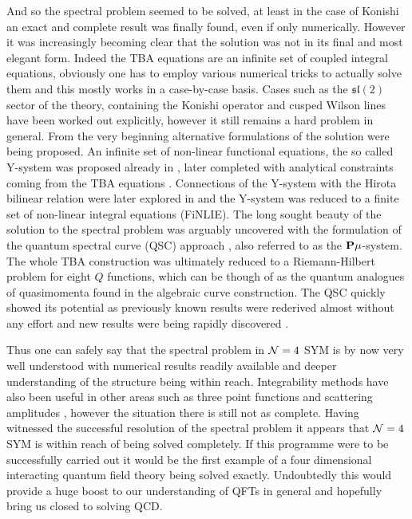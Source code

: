 And so the spectral problem seemed to be solved, at least in the case of Konishi an exact and complete result was finally found, even if only numerically.
However it was increasingly becoming clear that the solution was not in its final and most elegant form.
Indeed the TBA equations are an infinite set of coupled integral equations, obviously one has to employ various numerical tricks to actually solve them and this mostly works in a case-by-case basis. 
Cases such as the $\mathfrak{sl}(2)$ sector of the theory, containing the Konishi operator \cite{Gromov:2009bc} and cusped Wilson lines \cite{Correa:2012hh, Gromov:2012eu} have been worked out explicitly, however it still remains a hard problem in general.
From the very beginning alternative formulations of the solution were being proposed. 
An infinite set of non-linear functional equations, the so called Y-system was proposed already in \cite{Gromov:2009bc}, later completed with analytical constraints coming from the TBA equations \cite{Cavaglia:2010nm}.
Connections of the Y-system with the Hirota bilinear relation were later explored in \cite{Gromov:2011cx} and the Y-system was reduced to a finite set of non-linear integral equations (FiNLIE).
The long sought beauty of the solution to the spectral problem was arguably uncovered with the formulation of the quantum spectral curve (QSC) approach \cite{Gromov:2013pga,Gromov:2014caa}, also referred to as the ${\bf P}\mu$-system.
The whole TBA construction was ultimately reduced to a Riemann-Hilbert problem for eight $Q$ functions, which can be though of as the quantum analogues of quasimomenta found in the algebraic curve construction.
The QSC quickly showed its potential as previously known results were rederived almost without any effort and new results were being rapidly discovered \cite{Gromov:2013qga, Gromov:2014bva}.

Thus one can safely say that the spectral problem in $\mathcal{N}=4$ SYM is by now very well understood with numerical results readily available and deeper understanding of the structure being within reach.
Integrability methods have also been useful in other areas such as three point functions \cite{Escobedo:2010xs, Gromov:2012vu} and scattering amplitudes \cite{Drummond:2010km, Alday:2010kn}, however the situation there is still not as complete.
Having witnessed the successful resolution of the spectral problem it appears that $\mathcal{N}=4$ SYM is within reach of being solved completely.
If this programme were to be successfully carried out it would be the first example of a four dimensional interacting quantum field theory being solved exactly.
Undoubtedly this would provide a huge boost to our understanding of QFTs in general and hopefully bring us closed to solving QCD.

